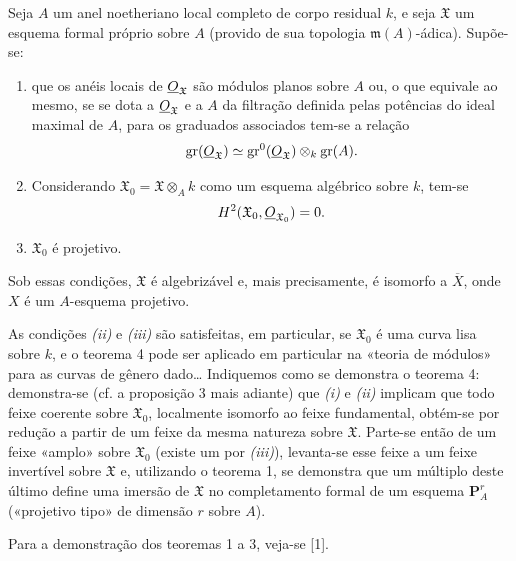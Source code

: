  Seja $A$ um anel noetheriano local completo de corpo
residual $k$, e seja $\mathfrak X$ um esquema formal próprio sobre $A$ (provido
de sua topologia $\mathfrak m(A)$-ádica). Supõe-se:
\begin{enumerate}
  \item[\textit{i.}] que os anéis locais de $\underline{O}_{\mathfrak X}$ são
    módulos planos sobre $A$ ou, o que equivale ao mesmo, se se dota a
    $\underline{O}_{\mathfrak X}$ e a $A$ da filtração definida pelas potências do
    ideal maximal de $A$, para os graduados associados tem-se a relação
    \[
      \operatorname{gr}(\underline{O}_{\mathfrak X})
      \simeq
      \operatorname{gr}^{0}(\underline{O}_{\mathfrak X})
      \otimes_k\operatorname{gr}(A).
    \]
  \item[\textit{ii.}] Considerando
    $\mathfrak X_0=\mathfrak X\otimes_A k$ como um esquema algébrico sobre
    $k$, tem-se
    \[
      H^2(\mathfrak X_0,\underline{O}_{\mathfrak X_0})=0.
    \]
  \item[\textit{iii.}] $\mathfrak X_0$ é projetivo.
\end{enumerate}
Sob essas condições, $\mathfrak X$ é algebrizável e, mais precisamente, é
isomorfo a $\overline X$, onde $X$ é um $A$-esquema projetivo.

As condições \textit{(ii)} e \textit{(iii)} são satisfeitas, em particular,
se $\mathfrak X_0$ é uma curva lisa sobre $k$, e o teorema 4 pode ser aplicado
em particular na «teoria de módulos» para as curvas de gênero dado\ldots{}
Indiquemos como se demonstra o teorema 4: demonstra-se (cf. a proposição 3
mais adiante) que \textit{(i)} e \textit{(ii)} implicam que todo feixe coerente
sobre $\mathfrak X_0$, localmente isomorfo ao feixe fundamental, obtém-se por
redução a partir de um feixe da mesma natureza sobre $\mathfrak X$. Parte-se
então de um feixe «amplo» sobre $\mathfrak X_0$ (existe um por
\textit{(iii)}), levanta-se esse feixe a um feixe invertível sobre $\mathfrak X$ e,
utilizando o teorema 1, se demonstra que um múltiplo deste último define uma
imersão de $\mathfrak X$ no completamento formal de um esquema
$\mathbf P_A^r$ («projetivo tipo» de dimensão $r$ sobre $A$).

Para a demonstração dos teoremas 1 a 3, veja-se [1].


